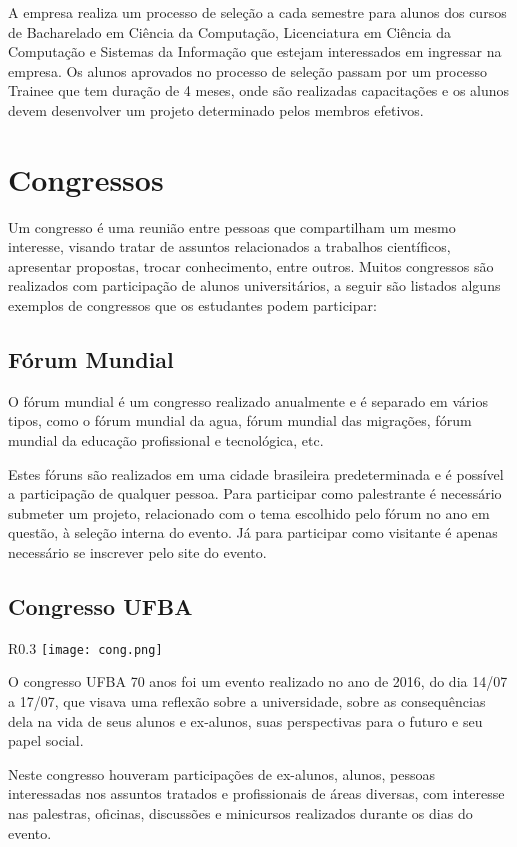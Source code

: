     \par A empresa realiza um processo de seleção a cada semestre para alunos dos cursos de Bacharelado em Ciência da Computação, Licenciatura em Ciência da Computação e Sistemas da Informação que estejam interessados em ingressar na empresa. Os alunos aprovados no processo de seleção passam por um processo Trainee que tem duração de 4 meses, onde são realizadas capacitações e os alunos devem desenvolver um projeto determinado pelos membros efetivos.
  

\section{Congressos}
    \par Um congresso é uma reunião entre pessoas que compartilham um mesmo interesse, visando tratar de assuntos relacionados a trabalhos científicos, apresentar propostas, trocar conhecimento, entre outros. Muitos congressos são realizados com participação de alunos universitários, a seguir são listados alguns exemplos de congressos que os estudantes podem participar:
        
\subsection{Fórum Mundial}
        \par O fórum mundial é um congresso realizado anualmente e é separado em vários tipos, como o fórum mundial da agua, fórum mundial das migrações, fórum mundial da educação profissional e tecnológica, etc. \par Estes fóruns são realizados em uma cidade brasileira predeterminada e é possível a participação de qualquer pessoa. Para participar como palestrante é necessário submeter um projeto, relacionado com o tema escolhido pelo fórum no ano em questão, à seleção interna do evento. Já para participar como visitante é apenas necessário se inscrever pelo site do evento.
\subsection{Congresso UFBA}
\begin{wrapfigure}{R}{0.3\textwidth}
            \centering
            \texttt{[image: cong.png]}
        \end{wrapfigure}
        O congresso UFBA 70 anos foi um evento realizado no ano de 2016, do dia 14/07 a 17/07, que visava uma reflexão sobre a universidade, sobre as consequências dela na vida de seus alunos e ex-alunos, suas perspectivas para o futuro e seu papel social. \par Neste congresso houveram participações de ex-alunos, alunos, pessoas interessadas nos assuntos tratados e profissionais de áreas diversas, com interesse nas palestras, oficinas, discussões e minicursos realizados durante os dias do evento.
        
